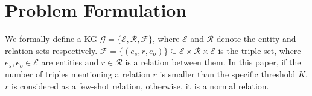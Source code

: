 \documentclass[11pt,a4paper]{article}
\begin{document}


\section{Problem Formulation}
\label{problem}

We formally define a KG $\mathcal{G} = \{\mathcal{E}, \mathcal{R}, \mathcal{F}\}$, where $\mathcal{E}$ and $\mathcal{R}$ denote the entity and relation sets respectively. $\mathcal{F} = \{(e_s, r, e_o)\} \subseteq \mathcal{E} \times \mathcal{R} \times \mathcal{E}$ is the triple set, where $e_s, e_o \in \mathcal{E}$ are entities and $r \in \mathcal{R}$ is a relation between them. In this paper, if the number of triples mentioning a relation $r$ is smaller than the specific threshold $K$, $r$ is considered as a few-shot relation, otherwise, it is a normal relation.
\end{document}
